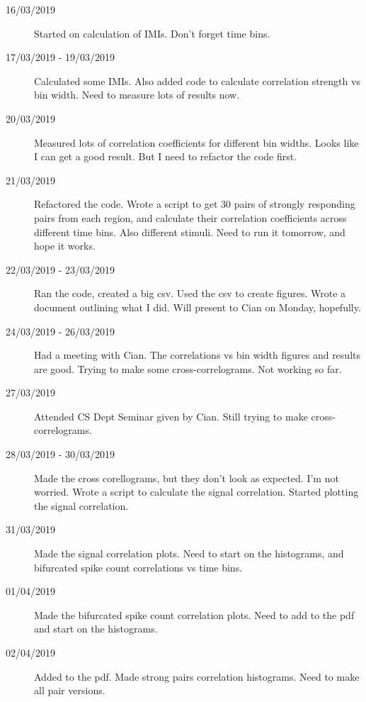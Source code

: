 \documentclass[a4paper,12pt]{article}
\theoremstyle{definition}
\begin{document}
\begin{description}
				\item[16/03/2019] Started on calculation of IMIs. Don't forget time bins.

				\item[17/03/2019 - 19/03/2019] Calculated some IMIs. Also added code to calculate correlation strength vs bin width. Need to measure lots of results now.

				\item[20/03/2019] Measured lots of correlation coefficients for different bin widths. Looks like I can get a good result. But I need to refactor the code first.

				\item[21/03/2019] Refactored the code. Wrote a script to get 30 pairs of strongly responding pairs from each region, and calculate their correlation coefficients across different time bins. Also different stimuli. Need to run it tomorrow, and hope it works.

				\item[22/03/2019 - 23/03/2019] Ran the code, created a big csv. Used the csv to create figures. Wrote a document outlining what I did. Will present to Cian on Monday, hopefully.

				\item[24/03/2019 - 26/03/2019] Had a meeting with Cian. The correlations vs bin width figures and results are good. Trying to make some cross-correlograms. Not working so far.

				\item[27/03/2019] Attended CS Dept Seminar given by Cian. Still trying to make cross-correlograms.

				\item[28/03/2019 - 30/03/2019] Made the cross corellograms, but they don't look as expected. I'm not worried. Wrote a script to calculate the signal correlation. Started plotting the signal correlation.

				\item[31/03/2019] Made the signal correlation plots. Need to start on the histograms, and bifurcated spike count correlations vs time bins.

				\item[01/04/2019] Made the bifurcated spike count correlation plots. Need to add to the pdf and start on the histograms.

				\item[02/04/2019] Added to the pdf. Made strong pairs correlation histograms. Need to make all pair versions.


\end{description}
\end{document}
